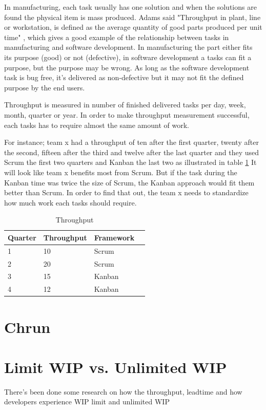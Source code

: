 \documentclass[UKenglish]{ifimaster}  %
\begin{document}
In manufacturing, each task usually has one solution and when the solutions are found the physical item is mass produced.  Adams said "Throughput in plant, line or workstation, is defined as the average quantity of good  parts produced per unit time" \parencite{Adams}, which gives a good example of the relationship between tasks in manufacturing and software development. In manufacturing the part either fits its purpose (good) or not (defective), in software development a tasks can fit a purpose, but the purpose may be wrong. As long as the software development task is bug free, it's delivered as non-defective but it may not fit the defined purpose by the end users. 

Throughput is measured in number of finished delivered tasks per day, week, month, quarter or year. In order to make throughput measurement successful, each tasks has to require almost the same amount of work.  

For instance; team x had a throughput of ten after the first quarter, twenty after the second, fifteen after the third and twelve after the last quarter and they used Scrum the first two quarters and Kanban the last two as illustrated in table \ref{tt}
It will look like team x benefits most from Scrum. But if the task during the Kanban time was twice the size of Scrum, the Kanban approach would fit them better than Scrum. In order to find that out, the team x needs to standardize how much work each tasks should require.

\begin{table}[ht]
\begin{center}
    \begin{tabular}{| l | l | l | l |}
    \hline
    Quarter & Throughput &  Framework\\ \hline
    1 & 10 & Scrum\\ \hline
    2 & 20 & Scrum \\ \hline
    3 & 15 & Kanban\\ \hline
    4 & 12 & Kanban\\ \hline
    \end{tabular}
\caption{Throughput}
\label{tt} %
\end{center}
\end{table}

\section{Chrun}
\section {Limit WIP vs. Unlimited WIP}
There's been done some research on how the throughput, leadtime and how developers experience WIP limit and unlimited WIP
\end{document}
